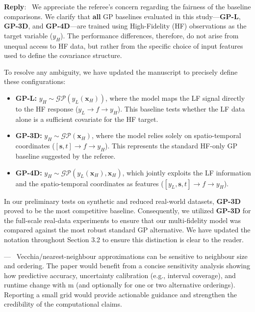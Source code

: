 \documentclass[12pt]{article}
\newcommand{\0}{\mathbf{0}}
\newcounter{reviewer}
\newcounter{point}[reviewer]
\renewcommand{\thepoint}{P\,\thereviewer.\arabic{point}}
\newenvironment{point}
   {\refstepcounter{point} \bigskip \noindent {\textbf{Point~\thepoint} } ---\ }
   {\par }
\newenvironment{reply}
   {\medskip \noindent \begin{sf}\color{Blue}\textbf{Reply}:\  }
   {\medskip \end{sf}}
\begin{document}
\begin{reply}
  We appreciate the referee's concern regarding the fairness of the baseline comparisons. We clarify that \textbf{all} GP baselines evaluated in this study—\textbf{GP-L}, \textbf{GP-3D}, and \textbf{GP-4D}—are trained using High-Fidelity (HF) observations as the target variable ($y_H$). The performance differences, therefore, do not arise from unequal access to HF data, but rather from the specific choice of input features used to define the covariance structure. 

To resolve any ambiguity, we have updated the manuscript to precisely define these configurations:
\begin{itemize}
    \item \textbf{GP-L:} $y_H \sim \mathcal{GP}(y_L(\mathbf{x}_H))$, where the model maps the LF signal directly to the HF response ($y_L \rightarrow f \rightarrow y_H$). This baseline tests whether the LF data alone is a sufficient covariate for the HF target.
    \item \textbf{GP-3D:} $y_H \sim \mathcal{GP}(\mathbf{x}_H)$, where the model relies solely on spatio-temporal coordinates ($[\mathbf{s}, t] \rightarrow f \rightarrow y_H$). This represents the standard HF-only GP baseline suggested by the referee.
    \item \textbf{GP-4D:} $y_H \sim \mathcal{GP}(y_L(\mathbf{x}_H), \mathbf{x}_H)$, which jointly exploits the LF information and the spatio-temporal coordinates as features ($[y_L, \mathbf{s}, t] \rightarrow f \rightarrow y_H$).
\end{itemize}

In our preliminary tests on synthetic and reduced real-world datasets, \textbf{GP-3D} proved to be the most competitive baseline. Consequently, we utilized \textbf{GP-3D} for the full-scale real-data experiments to ensure that our multi-fidelity model was compared against the most robust standard GP alternative. We have updated the notation throughout Section 3.2 to ensure this distinction is clear to the reader.
\end{reply}



\begin{point}
    Vecchia/nearest-neighbour approximations can be sensitive to neighbour
size and ordering. The paper would benefit from a concise sensitivity
analysis showing how predictive accuracy, uncertainty calibration (e.g.,
interval coverage), and runtime change with m (and optionally for one
or two alternative orderings). Reporting a small grid would provide
actionable guidance and strengthen the credibility of the computational
claims.
\end{point}
\end{document}
